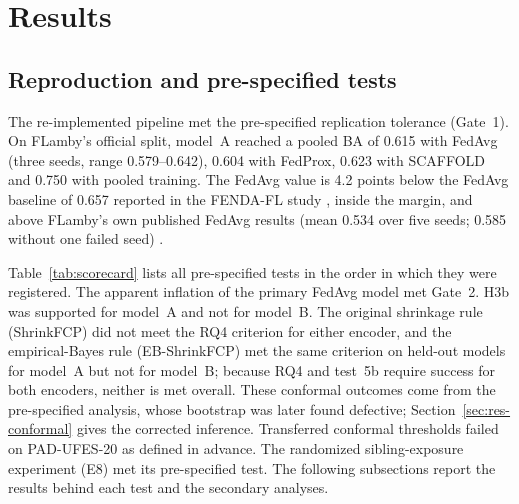 \documentclass[VANCOUVER,Times1COL]{WileyNJDv5}
\begin{document}
\section{Results}
\label{sec:results}

\subsection{Reproduction and pre-specified tests}
\label{sec:res-tests}

The re-implemented pipeline met the pre-specified replication tolerance (Gate~1). On FLamby's official
split, model~A reached a pooled BA of 0.615 with FedAvg (three seeds, range 0.579--0.642), 0.604 with
FedProx, 0.623 with SCAFFOLD and 0.750 with pooled training. The FedAvg value is 4.2 points below the
FedAvg baseline of 0.657 reported in the FENDA-FL study \cite{tavakoli2024fendafl}, inside the margin,
and above FLamby's own published FedAvg results (mean 0.534 over five seeds; 0.585 without one failed
seed) \cite{flamby2022}.

Table~\ref{tab:scorecard} lists all pre-specified tests in the order in which they were registered. The
apparent inflation of the primary FedAvg model met Gate~2. H3b was supported for model~A and not for
model~B. The original shrinkage rule (ShrinkFCP) did not meet the RQ4 criterion for either encoder, and
the empirical-Bayes rule (EB-ShrinkFCP) met the same criterion on held-out models for model~A but not for
model~B; because RQ4 and test~5b require success for both encoders, neither is met overall. These conformal outcomes come from the pre-specified analysis, whose bootstrap was later found defective; Section~\ref{sec:res-conformal} gives the corrected inference. Transferred
conformal thresholds failed on PAD-UFES-20 as defined in advance. The randomized sibling-exposure experiment (E8) met its pre-specified test. The following subsections
report the results behind each test and the secondary analyses.
\end{document}
